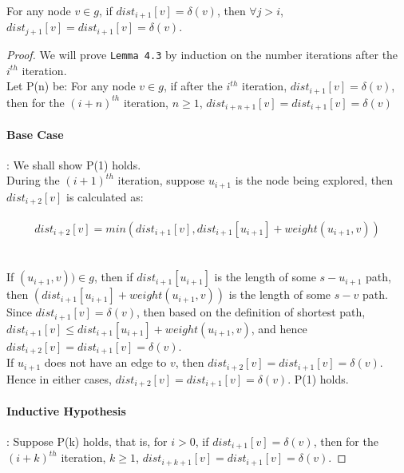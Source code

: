 \begin{sublemma} \label{lemma4.3}
For any node $v \in g$, if $dist_{i+1}[v] = \delta(v)$, then $\forall j > i$, $dist_{j+1}[v] = dist_{i+1}[v] = \delta(v)$. 
\end{sublemma}
\begin{proof}
We will prove \texttt{Lemma 4.3} by induction on the number iterations after the $i^{th}$ iteration. 
\\
Let P(n) be: For any node $v \in g$, if after the $i^{th}$ iteration, $dist_{i+1}[v] = \delta(v)$, then for the $(i+n)^{th}$ iteration, $n \geq 1$, $dist_{i+n+1}[v] = dist_{i+1}[v] = \delta(v)$

\paragraph*{Base Case}: We shall show P(1) holds. 
\\
During the $(i+1)^{th}$ iteration, suppose $u_{i+1}$ is the node being explored, then $dist_{i+2}[v]$ is calculated as: 
\\\\
\tab\[
        dist_{i+2}[v] = min(dist_{i+1}[v], dist_{i+1}[u_{i+1}] + weight(u_{i+1}, v))
      \]
\\\\
If $(u_{i+1}, v)) \in g $, then if $dist_{i+1}[u_{i+1}]$ is the length of some $s-u_{i+1}$ path, then $(dist_{i+1}[u_{i+1}] + weight(u_{i+1}, v))$ is the length of some $s-v$ path. Since $dist_{i+1}[v] = \delta(v)$, then based on the definition of shortest path, $dist_{i+1}[v] \leq dist_{i+1}[u_{i+1}] + weight(u_{i+1}, v)$, and hence $dist_{i+2}[v] = dist_{i+1}[v] = \delta(v)$. 
\\
If $u_{i+1}$ does not have an edge to $v$, then $dist_{i+2}[v] = dist_{i+1}[v] = \delta(v)$. 
\\
Hence in either cases, $dist_{i+2}[v] = dist_{i+1}[v] = \delta(v)$. P(1) holds. 


\paragraph*{Inductive Hypothesis}: Suppose P(k) holds, that is, for $i > 0$, if $dist_{i+1}[v] = \delta(v)$, then for the $(i+k)^{th}$ iteration, $k \geq 1$, $dist_{i+k+1}[v] = dist_{i+1}[v] = \delta(v)$. 



\end{proof}
